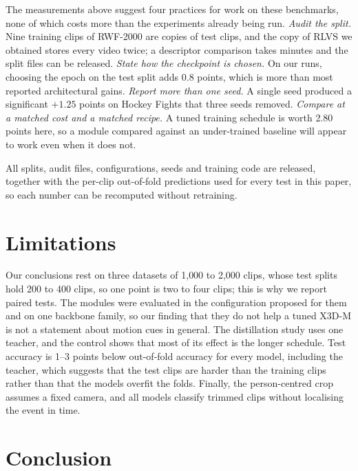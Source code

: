 \documentclass[conference]{IEEEtran}
\begin{document}
The measurements above suggest four practices for work on these benchmarks,
none of which costs more than the experiments already being run.
\emph{Audit the split.} Nine training clips of RWF-2000 are copies of test
clips, and the copy of RLVS we obtained stores every video twice; a
descriptor comparison takes minutes and the split files can be released.
\emph{State how the checkpoint is chosen.} On our runs, choosing the epoch
on the test split adds 0.8 points, which is more than most reported
architectural gains. \emph{Report more than one seed.} A single seed
produced a significant $+1.25$ points on Hockey Fights that three seeds
removed. \emph{Compare at a matched cost and a matched recipe.} A tuned
training schedule is worth 2.80 points here, so a module compared against
an under-trained baseline will appear to work even when it does not.

All splits, audit files, configurations, seeds and training code are
released, together with the per-clip out-of-fold predictions used for every
test in this paper, so each number can be recomputed without retraining.

\section{Limitations}

Our conclusions rest on three datasets of 1{,}000 to 2{,}000 clips, whose
test splits hold 200 to 400 clips, so one point is two to four clips; this
is why we report paired tests. The modules were evaluated in the
configuration proposed for them and on one backbone family, so our finding
that they do not help a tuned X3D-M is not a statement about motion cues in
general. The distillation study uses one teacher, and the control shows
that most of its effect is the longer schedule. Test accuracy is 1--3 points below
out-of-fold accuracy for every model, including the teacher, which
suggests that the test clips are harder than the training clips rather
than that the models overfit the folds. Finally, the person-centred crop
assumes a fixed camera, and all models classify trimmed clips without
localising the event in time.

\section{Conclusion}
\label{sec:conclusion}
\end{document}
